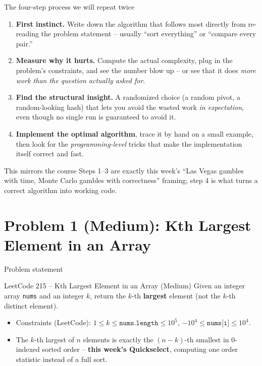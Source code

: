 \documentclass[11pt,aspectratio=169]{beamer}
\begin{document}
\begin{frame}{The four-step process we will repeat twice}
  \begin{enumerate}
    \item \textbf{First instinct.} Write down the algorithm that follows most directly
    from re-reading the problem statement -- usually ``sort everything'' or
    ``compare every pair.''
    \item \textbf{Measure why it hurts.} Compute the actual complexity, plug in the
    problem's constraints, and see the number blow up -- or see that it does
    \emph{more work than the question actually asked for}.
    \item \textbf{Find the structural insight.} A randomized choice (a random pivot, a
    random-looking hash) that lets you avoid the wasted work \emph{in expectation},
    even though no single run is guaranteed to avoid it.
    \item \textbf{Implement the optimal algorithm}, trace it by hand on a small example,
    then look for the \emph{programming-level} tricks that make the implementation
    itself correct and fast.
  \end{enumerate}
  \begin{alertblock}{This mirrors the course}
    Steps 1--3 are exactly this week's ``Las Vegas gambles with time, Monte Carlo
    gambles with correctness'' framing; step 4 is what turns a correct algorithm into
    working code.
  \end{alertblock}
\end{frame}

\section{Problem 1 (Medium): Kth Largest Element in an Array}

\begin{frame}{Problem statement}
  \begin{block}{LeetCode 215 -- Kth Largest Element in an Array
  (\textcolor{blue!50!black}{Medium})}
    Given an integer array \texttt{nums} and an integer $k$, return the $k$-th
    \textbf{largest} element (not the $k$-th distinct element).
  \end{block}
  \begin{itemize}
    \item Constraints (LeetCode): $1 \le k \le \texttt{nums.length} \le 10^5$,
    $-10^4 \le \texttt{nums[i]} \le 10^4$.
    \item The $k$-th largest of $n$ elements is exactly the $(n-k)$-th smallest in
    $0$-indexed sorted order -- \textbf{this week's Quickselect}, computing one order
    statistic instead of a full sort.
  \end{itemize}
\end{frame}
\end{document}
